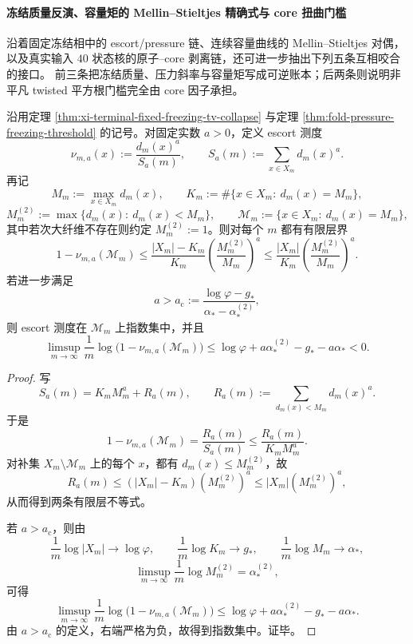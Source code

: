 \paragraph{冻结质量反演、容量矩的 Mellin--Stieltjes 精确式与 core 扭曲门槛}
沿着固定冻结相中的 escort/pressure 链、连续容量曲线的 Mellin--Stieltjes 对偶，
以及真实输入 \(40\) 状态核的原子--core 剥离链，还可进一步抽出下列五条互相咬合的接口。
前三条把冻结质量、压力斜率与容量矩写成可逆账本；后两条则说明非平凡 twisted 平方根门槛完全由 core 因子承担。

\begin{theorem}\label{thm:xi-time-part57b-escort-maxfiber-layer-concentration}
沿用定理 \ref{thm:xi-terminal-fixed-freezing-tv-collapse} 与定理
\ref{thm:fold-pressure-freezing-threshold} 的记号。对固定实数 \(a>0\)，定义 escort 测度
\[
\nu_{m,a}(x):=\frac{d_m(x)^a}{S_a(m)},
\qquad
S_a(m):=\sum_{x\in X_m}d_m(x)^a.
\]
再记
\[
M_m:=\max_{x\in X_m}d_m(x),\qquad
K_m:=\#\{x\in X_m:\ d_m(x)=M_m\},
\]
\[
M_m^{(2)}:=\max\{d_m(x):\ d_m(x)<M_m\},
\qquad
\mathcal M_m:=\{x\in X_m:\ d_m(x)=M_m\},
\]
其中若次大纤维不存在则约定 \(M_m^{(2)}:=1\)。则对每个 \(m\) 都有有限层界
\[
\boxed{\;
1-\nu_{m,a}(\mathcal M_m)
\le
\frac{|X_m|-K_m}{K_m}\left(\frac{M_m^{(2)}}{M_m}\right)^a
\le
\frac{|X_m|}{K_m}\left(\frac{M_m^{(2)}}{M_m}\right)^a.\;}
\]
若进一步满足
\[
a>a_{\mathrm c}:=\frac{\log\varphi-g_*}{\alpha_*-\alpha_*^{(2)}},
\]
则 escort 测度在 \(\mathcal M_m\) 上指数集中，并且
\[
\limsup_{m\to\infty}\frac1m
\log\bigl(1-\nu_{m,a}(\mathcal M_m)\bigr)
\le
\log\varphi+a\alpha_*^{(2)}-g_*-a\alpha_*<0.
\]
\end{theorem}
\begin{proof}
写
\[
S_a(m)=K_mM_m^a+R_a(m),
\qquad
R_a(m):=\sum_{d_m(x)<M_m}d_m(x)^a.
\]
于是
\[
1-\nu_{m,a}(\mathcal M_m)=\frac{R_a(m)}{S_a(m)}
\le
\frac{R_a(m)}{K_mM_m^a}.
\]
对补集 \(X_m\setminus\mathcal M_m\) 上的每个 \(x\)，都有 \(d_m(x)\le M_m^{(2)}\)，故
\[
R_a(m)\le (|X_m|-K_m)(M_m^{(2)})^a
\le |X_m|(M_m^{(2)})^a,
\]
从而得到两条有限层不等式。

若 \(a>a_{\mathrm c}\)，则由
\[
\frac1m\log|X_m|\to\log\varphi,\qquad
\frac1m\log K_m\to g_*,
\qquad
\frac1m\log M_m\to\alpha_*,
\]
\[
\limsup_{m\to\infty}\frac1m\log M_m^{(2)}=\alpha_*^{(2)},
\]
可得
\[
\limsup_{m\to\infty}\frac1m
\log\bigl(1-\nu_{m,a}(\mathcal M_m)\bigr)
\le
\log\varphi+a\alpha_*^{(2)}-g_*-a\alpha_*.
\]
由 \(a>a_{\mathrm c}\) 的定义，右端严格为负，故得到指数集中。证毕。
\end{proof}

